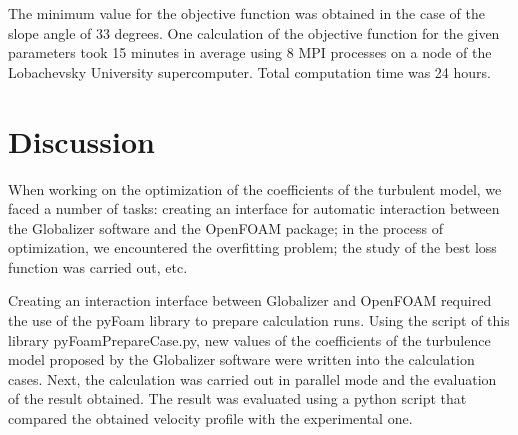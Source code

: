 \documentclass[mathematics,article,submit,pdftex,moreauthors]{Definitions/mdpi}
\begin{document}
The minimum value for the objective function was obtained in the case of the slope angle of 33 degrees. One calculation of the objective function for the given parameters took 15 minutes in average using 8 MPI processes on a node of the Lobachevsky University supercomputer. Total computation time was 24 hours.

\section{Discussion}

When working on the optimization of the coefficients of the turbulent model, we faced a number of tasks: creating an interface for automatic interaction between the Globalizer software and the OpenFOAM package; in the process of optimization, we encountered the overfitting problem; the study of the best loss function was carried out, etc.

Creating an interaction interface between Globalizer and OpenFOAM required the use of the pyFoam library to prepare calculation runs. Using the script of this library pyFoamPrepareCase.py, new values of the coefficients of the turbulence model proposed by the Globalizer software were written into the calculation cases. Next, the calculation was carried out in parallel mode and the evaluation of the result obtained. The result was evaluated using a python script that compared the obtained velocity profile with the experimental one.
\end{document}
